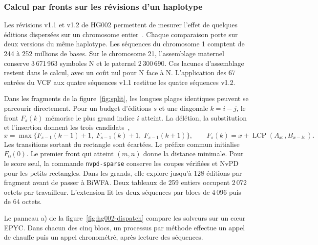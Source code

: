 \subsubsection{Calcul par fronts sur les révisions d’un haplotype}
Les révisions v1.1 et v1.2 de HG002 permettent de mesurer l’effet de quelques éditions dispersées sur un chromosome entier~\cite{hg002,hg002data}. Chaque comparaison porte sur deux versions du même haplotype. Les séquences du chromosome 1 comptent de 244 à 252 millions de bases. Sur le chromosome 21, l'assemblage maternel conserve 3\,671\,963 symboles N et le paternel 2\,300\,690. Ces lacunes d’assemblage restent dans le calcul, avec un coût nul pour N face à N. L’application des 67 entrées du VCF aux quatre séquences v1.1 restitue les quatre séquences v1.2.

Dans les fragments de la figure~\ref{fig:split}, les longues plages identiques peuvent se parcourir directement. Pour un budget d’éditions \(s\) et une diagonale \(k=i-j\), le front \(F_s(k)\) mémorise le plus grand indice \(i\) atteint. La délétion, la substitution et l’insertion donnent les trois candidats~\cite{ukkonen,wfa},
\[
 x=\max\{F_{s-1}(k-1)+1,\;F_{s-1}(k)+1,\;F_{s-1}(k+1)\},
 \qquad F_s(k)=x+\operatorname{LCP}(A_{x:},B_{x-k:}).
\]
Les transitions sortant du rectangle sont écartées. Le préfixe commun initialise \(F_0(0)\). Le premier front qui atteint \((m,n)\) donne la distance minimale. Pour le score seul, la commande \texttt{nvpd-sparse} conserve les coupes vérifiées et NvPD pour les petits rectangles. Dans les grands, elle explore jusqu’à 128 éditions par fragment avant de passer à BiWFA. Deux tableaux de 259 entiers occupent 2\,072 octets par travailleur. L’extension lit les deux séquences par blocs de 4\,096 puis de 64 octets.

Le panneau a) de la figure~\ref{fig:hg002-dispatch} compare les solveurs sur un cœur EPYC. Dans chacun des cinq blocs, un processus par méthode effectue un appel de chauffe puis un appel chronométré, après lecture des séquences.

